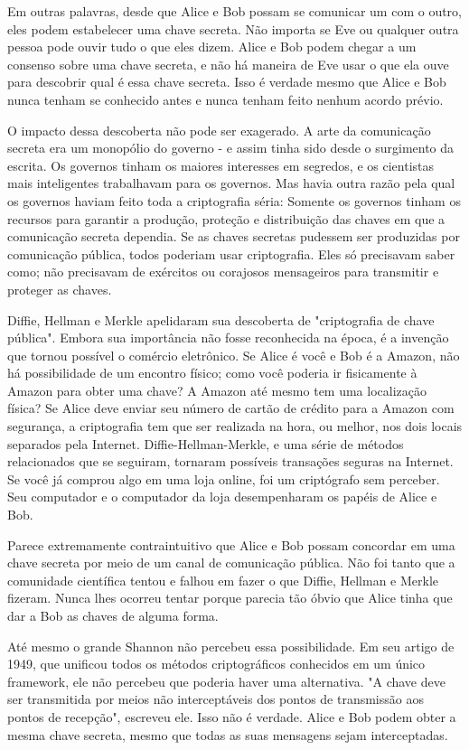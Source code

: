 \documentclass{book}
\begin{document}
Em outras palavras, desde que Alice e Bob possam se comunicar um com o outro, eles podem estabelecer uma chave secreta. Não importa se Eve ou qualquer outra pessoa pode ouvir tudo o que eles dizem. Alice e Bob podem chegar a um consenso sobre uma chave secreta, e não há maneira de Eve usar o que ela ouve para descobrir qual é essa chave secreta. Isso é verdade mesmo que Alice e Bob nunca tenham se conhecido antes e nunca tenham feito nenhum acordo prévio.

O impacto dessa descoberta não pode ser exagerado. A arte da comunicação secreta era um monopólio do governo - e assim tinha sido desde o surgimento da escrita. Os governos tinham os maiores interesses em segredos, e os cientistas mais inteligentes trabalhavam para os governos. Mas havia outra razão pela qual os governos haviam feito toda a criptografia séria: Somente os governos tinham os recursos para garantir a produção, proteção e distribuição das chaves em que a comunicação secreta dependia. Se as chaves secretas pudessem ser produzidas por comunicação pública, todos poderiam usar criptografia. Eles só precisavam saber como; não precisavam de exércitos ou corajosos mensageiros para transmitir e proteger as chaves.

Diffie, Hellman e Merkle apelidaram sua descoberta de "criptografia de chave pública". Embora sua importância não fosse reconhecida na época, é a invenção que tornou possível o comércio eletrônico. Se Alice é você e Bob é a Amazon, não há possibilidade de um encontro físico; como você poderia ir fisicamente à Amazon para obter uma chave? A Amazon até mesmo tem uma localização física? Se Alice deve enviar seu número de cartão de crédito para a Amazon com segurança, a criptografia tem que ser realizada na hora, ou melhor, nos dois locais separados pela Internet. Diffie-Hellman-Merkle, e uma série de métodos relacionados que se seguiram, tornaram possíveis transações seguras na Internet. Se você já comprou algo em uma loja online, foi um criptógrafo sem perceber. Seu computador e o computador da loja desempenharam os papéis de Alice e Bob.

Parece extremamente contraintuitivo que Alice e Bob possam concordar em uma chave secreta por meio de um canal de comunicação pública. Não foi tanto que a comunidade científica tentou e falhou em fazer o que Diffie, Hellman e Merkle fizeram. Nunca lhes ocorreu tentar porque parecia tão óbvio que Alice tinha que dar a Bob as chaves de alguma forma.

Até mesmo o grande Shannon não percebeu essa possibilidade. Em seu artigo de 1949, que unificou todos os métodos criptográficos conhecidos em um único framework, ele não percebeu que poderia haver uma alternativa. "A chave deve ser transmitida por meios não interceptáveis dos pontos de transmissão aos pontos de recepção", escreveu ele. Isso não é verdade. Alice e Bob podem obter a mesma chave secreta, mesmo que todas as suas mensagens sejam interceptadas.
\end{document}

